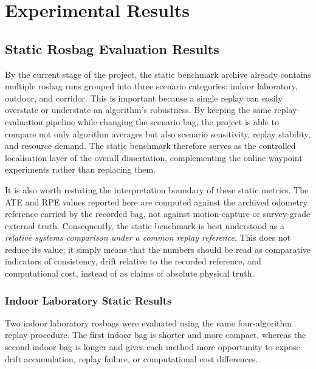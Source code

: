 \documentclass[12pt,a4paper]{report}
\begin{document}
\chapter{Experimental Results}

\section{Static Rosbag Evaluation Results}
By the current stage of the project, the static benchmark archive already contains multiple rosbag runs grouped into three scenario categories: indoor laboratory, outdoor, and corridor. This is important because a single replay can easily overstate or understate an algorithm's robustness. By keeping the same replay-evaluation pipeline while changing the scenario bag, the project is able to compare not only algorithm averages but also scenario sensitivity, replay stability, and resource demand. The static benchmark therefore serves as the controlled localisation layer of the overall dissertation, complementing the online waypoint experiments rather than replacing them.

It is also worth restating the interpretation boundary of these static metrics. The ATE and RPE values reported here are computed against the archived odometry reference carried by the recorded bag, not against motion-capture or survey-grade external truth. Consequently, the static benchmark is best understood as a \emph{relative systems comparison under a common replay reference}. This does not reduce its value; it simply means that the numbers should be read as comparative indicators of consistency, drift relative to the recorded reference, and computational cost, instead of as claims of absolute physical truth.

\subsection{Indoor Laboratory Static Results}
Two indoor laboratory rosbags were evaluated using the same four-algorithm replay procedure. The first indoor bag is shorter and more compact, whereas the second indoor bag is longer and gives each method more opportunity to expose drift accumulation, replay failure, or computational cost differences.
\end{document}
